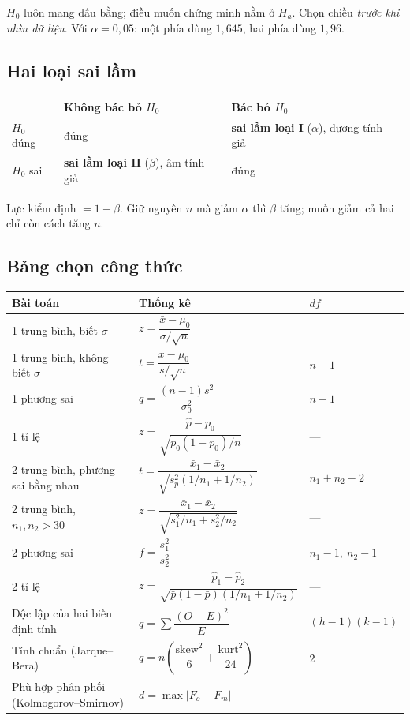 \documentclass[11pt]{article}
\begin{document}
$H_0$ luôn mang dấu bằng; điều muốn chứng minh nằm ở $H_a$. Chọn chiều
\emph{trước khi nhìn dữ liệu}. Với $\alpha = 0{,}05$: một phía dùng $1{,}645$, hai
phía dùng $1{,}96$.

\subsection*{Hai loại sai lầm}

\begin{center}
\begin{tabular}{@{}lll@{}}
\toprule
 & \textbf{Không bác bỏ $H_0$} & \textbf{Bác bỏ $H_0$} \\
\midrule
$H_0$ đúng & đúng & \textbf{sai lầm loại I} ($\alpha$), dương tính giả \\
$H_0$ sai & \textbf{sai lầm loại II} ($\beta$), âm tính giả & đúng \\
\bottomrule
\end{tabular}
\end{center}

Lực kiểm định $= 1-\beta$. Giữ nguyên $n$ mà giảm $\alpha$ thì $\beta$ tăng; muốn
giảm cả hai chỉ còn cách tăng $n$.

\subsection*{Bảng chọn công thức}

\begin{center}
\begin{tabular}{@{}lll@{}}
\toprule
\textbf{Bài toán} & \textbf{Thống kê} & \textbf{$df$} \\
\midrule
1 trung bình, biết $\sigma$ &
  $z = \dfrac{\bar x - \mu_0}{\sigma/\sqrt n}$ & --- \\[10pt]
1 trung bình, không biết $\sigma$ &
  $t = \dfrac{\bar x - \mu_0}{s/\sqrt n}$ & $n-1$ \\[10pt]
1 phương sai &
  $q = \dfrac{(n-1)s^2}{\sigma_0^2}$ & $n-1$ \\[10pt]
1 tỉ lệ &
  $z = \dfrac{\hat p - p_0}{\sqrt{p_0(1-p_0)/n}}$ & --- \\[10pt]
2 trung bình, phương sai bằng nhau &
  $t = \dfrac{\bar x_1 - \bar x_2}{\sqrt{s_p^2(1/n_1+1/n_2)}}$ & $n_1+n_2-2$ \\[10pt]
2 trung bình, $n_1,n_2 > 30$ &
  $z = \dfrac{\bar x_1 - \bar x_2}{\sqrt{s_1^2/n_1+s_2^2/n_2}}$ & --- \\[10pt]
2 phương sai &
  $f = \dfrac{s_1^2}{s_2^2}$ & $n_1-1,\ n_2-1$ \\[10pt]
2 tỉ lệ &
  $z = \dfrac{\hat p_1-\hat p_2}{\sqrt{\bar p(1-\bar p)(1/n_1+1/n_2)}}$ & --- \\[10pt]
Độc lập của hai biến định tính &
  $q = \sum\dfrac{(O-E)^2}{E}$ & $(h-1)(k-1)$ \\[10pt]
Tính chuẩn (Jarque--Bera) &
  $q = n\!\left(\dfrac{\text{skew}^2}{6}+\dfrac{\text{kurt}^2}{24}\right)$ & 2 \\[10pt]
Phù hợp phân phối (Kolmogorov--Smirnov) &
  $d = \max|F_o - F_m|$ & --- \\
\bottomrule
\end{tabular}
\end{center}
\end{document}
